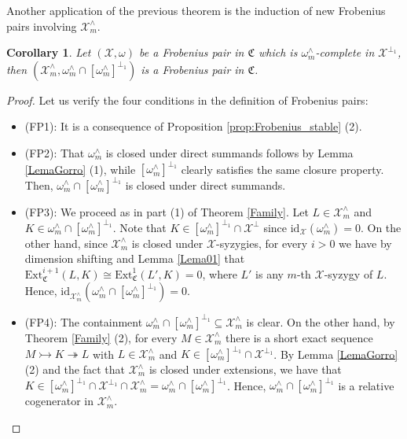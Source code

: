 \documentclass[10pt,reqno]{amsart}
\numberwithin{equation}{section}
\newtheorem{corollary}[definition]{Corollary}
\theoremstyle{remark}
\newcommand{\Ext}{\mathrm{Ext}}
\newcommand{\C}{\mathfrak{C}}
\newcommand{\X}{\mathcal{X}}
\newcommand{\id}{\mathrm{id}}
\begin{document}
Another application of the previous theorem is the induction of new Frobenius pairs involving $\X^\wedge_m$.


\begin{corollary}\label{coro:inducedXmFP}
Let $(\X,\omega)$ be a Frobenius pair in $\C$ which is $\omega^{\wedge}_m$-complete in $\X^{\perp_1}$, then $(\X^\wedge_m, \omega^\wedge_m \cap [\omega^\wedge_m]^{\perp_1})$ is a Frobenius pair in $\C$.  
\end{corollary}


\begin{proof}
Let us verify the four conditions in the definition of Frobenius pairs:
\begin{itemize}
\item {\sf (FP1)}: It is a consequence of Proposition \ref{prop:Frobenius_stable} (2). 

\item {\sf (FP2)}: That $\omega^\wedge_m$ is closed under direct summands follows by Lemma \ref{LemaGorro} (1), while $[\omega^\wedge_m]^{\perp_1}$ clearly satisfies the same closure property. Then, $\omega^\wedge_m \cap [\omega^\wedge_m]^{\perp_1}$ is closed under direct summands. 

\item {\sf (FP3)}: We proceed as in part (1) of Theorem \ref{Family}. Let $L \in \X^\wedge_m$ and $K \in \omega^\wedge_m \cap [\omega^\wedge_m]^{\perp_1}$. Note that $K \in  [\omega^\wedge_m]^{\perp_1} \cap \X^\perp$ since $\id_{\X}(\omega^\wedge_m) = 0$. On the other hand, since $\X^\wedge_m$ is closed under $\X$-syzygies, for every $i > 0$ we have by dimension shifting and Lemma \ref{Lema01} that $\Ext^{i+1}_{\C}(L,K) \cong \Ext^1_{\C}(L',K) = 0$, where $L'$ is any $m$-th $\X$-syzygy of $L$. Hence, $\id_{\X^\wedge_m}(\omega^\wedge_m \cap [\omega^\wedge_m]^{\perp_1}) = 0$.

\item {\sf (FP4)}: The containment $\omega^\wedge_m \cap [\omega^\wedge_m]^{\perp_1} \subseteq \X^\wedge_m$ is clear. On the other hand, by Theorem \ref{Family} (2), for every $M \in \X^\wedge_m$ there is a short exact sequence $M \rightarrowtail K \twoheadrightarrow L$ with $L \in \X^\wedge_m$ and $K \in [\omega^\wedge_m]^{\perp_1} \cap \X^{\perp_1}$. By Lemma \ref{LemaGorro} (2) and the fact that $\X^\wedge_m$ is closed under extensions, we have that $K \in [\omega^\wedge_m]^{\perp_1} \cap \X^{\perp_1} \cap \X^\wedge_m = \omega^\wedge_m \cap [\omega^\wedge_m]^{\perp_1}$. Hence, $\omega^\wedge_m \cap [\omega^\wedge_m]^{\perp_1}$ is a relative cogenerator in $\X^\wedge_m$.
\end{itemize}
\end{proof}
\end{document}

